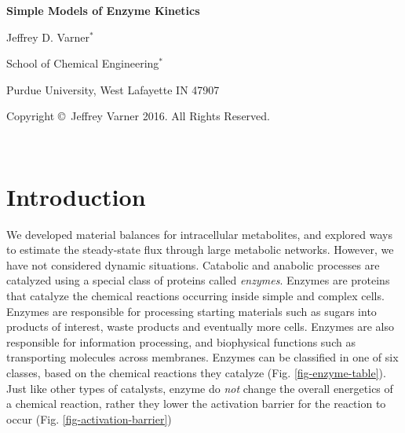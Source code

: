 \documentclass[11pt]{article}
\theoremstyle{definition}
\begin{document}
{\par\centering\textbf{\Large Simple Models of Enzyme Kinetics}}
\vspace{0.2in}
{\par \centering \large{Jeffrey D. Varner$^{*}$}}
\vspace{0.05in}
{\par \centering \large{School of Chemical Engineering$^{*}$}}
{\par \centering \large{Purdue University, West Lafayette IN 47907}}
\vspace{0.1in}
{\par \centering \small{Copyright \copyright\ Jeffrey Varner 2016. All Rights Reserved.}}\\

\date{}
\thispagestyle{empty}

\setcounter{page}{1}



\section*{Introduction}
We developed material balances for intracellular metabolites, and explored ways to estimate the steady-state flux through large metabolic networks.
However, we have not considered dynamic situations. Catabolic and anabolic processes are catalyzed using a special class of proteins called \textit{enzymes}.
Enzymes are proteins that catalyze the chemical reactions occurring inside simple and complex cells.
Enzymes are responsible for processing starting materials such as sugars into products of interest, waste products and eventually more cells.
Enzymes are also responsible for information processing, and biophysical functions such as transporting molecules across membranes.
Enzymes can be classified in one of six classes, based on the chemical reactions they catalyze (Fig. \ref{fig-enzyme-table}).
Just like other types of catalysts, enzyme do \textit{not} change the overall energetics of a chemical reaction, rather they lower the activation
barrier for the reaction to occur (Fig. \ref{fig-activation-barrier})
\end{document}
